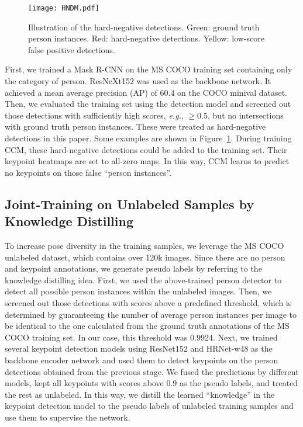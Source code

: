 \documentclass[twocolumn]{svjour3}          \smartqed  \usepackage{natbib}
\begin{document}
\begin{figure}[t]
\begin{center}
   \texttt{[image: HNDM.pdf]}
\end{center}
   \caption{Illustration of the hard-negative detections. Green: ground truth person instances. Red: hard-negative detections. Yellow: low-score false positive detections.}
\label{fig:hndm}
\end{figure}

First, we trained a Mask R-CNN on the MS COCO training set containing only the category of person. ResNeXt152 was used as the backbone network. It achieved a mean average precision (AP) of 60.4 on the COCO minival dataset. Then, we evaluated the training set using the detection model and screened out those detections with sufficiently high scores, \emph{e.g.}, $ \ge0.5$, but no intersections with ground truth person instances. These were treated as hard-negative detections in this paper. Some examples are shown in Figure~\ref{fig:hndm}. During training CCM, these hard-negative detections could be added to the training set. Their keypoint heatmaps are set to all-zero maps. In this way, CCM learns to predict no keypoints on those false ``person instances''.

\subsection{Joint-Training on Unlabeled Samples by Knowledge Distilling}
\label{subsec:unlabel}
To increase pose diversity in the training samples, we leverage the MS COCO unlabeled dataset, which contains over 120k images. Since there are no person and keypoint annotations, we generate pseudo labels by referring to the knowledge distilling idea. First, we used the above-trained person detector to detect all possible person instances within the unlabeled images. Then, we screened out those detections with scores above a predefined threshold, which is determined by guaranteeing the number of average person instances per image to be identical to the one calculated from the ground truth annotations of the MS COCO training set. In our case, this threshold was 0.9924. Next, we trained several keypoint detection models using ResNet152 and HRNet-w48 as the backbone encoder network and used them to detect keypoints on the person detections obtained from the previous stage. We fused the predictions by different models, kept all keypoints with scores above 0.9 as the pseudo labels, and treated the rest as unlabeled. In this way, we distill the learned ``knowledge'' in the keypoint detection model to the pseudo labels of unlabeled training samples and use them to supervise the network.
\end{document}
